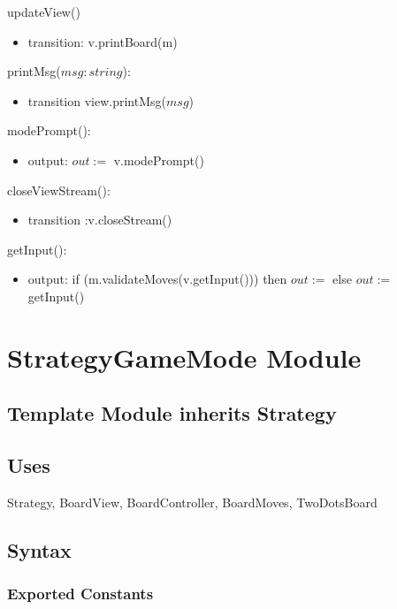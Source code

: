 \documentclass[12pt]{article}
\begin{document}
\noindent updateView()
\begin{itemize}
\item transition: v.printBoard(m)
\end{itemize}

\noindent printMsg($msg : string$): 
\begin{itemize}
\item transition view.printMsg($msg$)
\end{itemize}


\noindent modePrompt(): 
\begin{itemize}
\item output: $out := $ v.modePrompt()
\end{itemize}

\noindent closeViewStream(): 
\begin{itemize}
\item transition :v.closeStream()
\end{itemize}


\noindent getInput(): 
\begin{itemize}
\item output: if (m.validateMoves(v.getInput())) then $out:=$ else $out :=$ getInput()
\end{itemize}


\newpage

\section* {StrategyGameMode Module}

\subsection* {Template Module inherits Strategy}


\subsection*{Uses}
Strategy, BoardView, BoardController, BoardMoves, TwoDotsBoard

\subsection* {Syntax}

\subsubsection* {Exported Constants}
\end{document}
